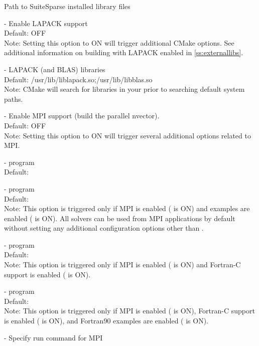 \begin{description}
  Path to SuiteSparse installed library files
\item[\id{LAPACK\_ENABLE}] -  
  Enable LAPACK support
  \\
  Default: OFF
  \\
  Note: Setting this option to ON will trigger additional CMake
  options. See additional information on building with LAPACK enabled
  in \ref{ss:externallibs}.
\item[\id{LAPACK\_LIBRARIES}] - 
  LAPACK (and BLAS) libraries
  \\
  Default: /usr/lib/liblapack.so;/usr/lib/libblas.so
  \\
  Note: CMake will search for libraries in your  prior
  to searching default system paths.
\item[\id{MPI\_ENABLE}] -  
  Enable MPI support (build the parallel nvector).
  \\
  Default: OFF 
  \\
  Note: Setting this option to ON will trigger several additional options
  related to MPI.
\item[\id{MPI\_MPICC}] - 
   program
  \\
  Default: 
\item[\id{MPI\_MPICXX}] - 
   program
  \\
  Default: 
  \\
  Note: This option is triggered only if MPI is enabled
  ( is ON) and {\CPP} examples are enabled
  ( is ON). All {\sundials}
  solvers can be used from {\CPP} MPI applications by default
  without setting any additional configuration options other than
  .
\item[\id{MPI\_MPIF77}] - 
   program
  \\
  Default: 
  \\
  Note: This option is triggered only if MPI is enabled
  ( is ON) and Fortran-C support is enabled
  ( is ON). 
\item[\id{MPI\_MPIF90}] - 
   program
  \\
  Default: 
  \\
  Note: This option is triggered only if MPI is enabled
  ( is ON), Fortran-C support is enabled
  ( is ON), and Fortran90 examples are enabled
  ( is ON).
\item[\id{MPI\_RUN\_COMMAND}] -  
  Specify run command for MPI  
  \\

\end{description}
